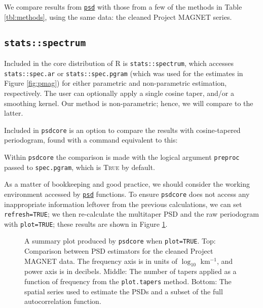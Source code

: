 \documentclass[10pt]{article}\usepackage[]{graphicx}\usepackage[]{color}
\newcommand{\SC}[1]{\textsc{#1}}
\newcommand{\Rcmd}[1]{\texttt{#1}}
\newcommand{\psd}[0]{\href{https://www.github.com/abarbour/psd/}{\color{blue}\Rcmd{psd}}}
\begin{document}


We compare results from
\psd{} with those from a few of the methods in Table \ref{tbl:methods},
using the same data: the cleaned Project MAGNET series.

\subsection{\Rcmd{stats::spectrum}}

Included in the core distribution of R is \Rcmd{stats::spectrum}, which
accesses \Rcmd{stats::spec.ar} or \Rcmd{stats::spec.pgram} (which was used
for the estimates in Figure \ref{fig:pmag}) for either
parametric and non-parametric estimation, respectively.  
The user can optionally apply a single cosine taper, and/or a smoothing kernel.
Our method is non-parametric; hence, we will compare to the latter.

Included in \Rcmd{psdcore} is an option to compare the 
results with cosine-tapered periodogram,
found with a command equivalent to this:

Within \Rcmd{psdcore} the comparison is made with the logical argument \Rcmd{preproc} 
passed to \Rcmd{spec.pgram}, which is \SC{True} by default.

As a matter of bookkeeping and good practice, we should consider the working environment
accessed by \psd{} functions. 
To ensure \Rcmd{psdcore} does not access any inappropriate information leftover
from the previous calculations, we can set \Rcmd{refresh=TRUE}; we then 
re-calculate the multitaper PSD and the raw periodogram with \Rcmd{plot=TRUE}; these
results are shown in Figure \ref{fig:two}.

\begin{figure}[!htbp]
\begin{center}

\caption{A summary plot produced by \Rcmd{psdcore} when
\Rcmd{plot=TRUE}.  
Top: Comparison between PSD estimators for the 
cleaned Project MAGNET data. The frequency axis is in units of $\log_{10}$ km$^{-1}$,
and power axis is in decibels.
%
Middle: The number of tapers applied as a function of frequency from
the \Rcmd{plot.tapers} method. 
%
Bottom: The spatial series used to estimate the PSDs and a subset
of the full autocorrelation function.}
\label{fig:two}
\end{center}
\end{figure}

\clearpage
\end{document}
